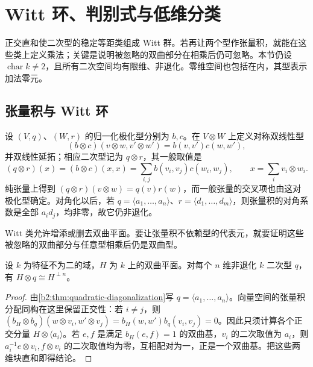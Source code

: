 
%
%

\section{Witt 环、判别式与低维分类}
\label{b2:sec:B02}

正交直和使二次型的稳定等距类组成 Witt 群。若再让两个型作张量积，就能在这些类上定义乘法；关键是说明被忽略的双曲部分在相乘后仍可忽略。本节仍设 \(\operatorname{char}k\ne2\)，且所有二次空间均有限维、非退化。零维空间也包括在内，其型表示加法零元。

\subsection{张量积与 Witt 环}
\label{b2:subsec:B02:01}

设 \((V,q)\)、\((W,r)\) 的归一化极化型分别为 \(b,c\)。在 \(V\otimes W\) 上定义对称双线性型
\[
	(b\otimes c)(v\otimes w,v'\otimes w')=b(v,v')c(w,w'),
\]
并双线性延拓；相应二次型记为 \(q\otimes r\)，其一般取值是
\[
	(q\otimes r)(x)=(b\otimes c)(x,x) =\sum_{i,j}b(v_i,v_j)c(w_i,w_j), \qquad x=\sum_i v_i\otimes w_i.
\]
纯张量上得到 \((q\otimes r)(v\otimes w)=q(v)r(w)\)，而一般张量的交叉项也由这对极化型确定。对角化以后，若 \(q=\langle a_1,\ldots,a_n\rangle\)、\(r=\langle d_1,\ldots,d_m\rangle\)，则张量积的对角系数是全部 \(a_id_j\)，均非零，故它仍非退化。

\ProseParagraphBreak
Witt 类允许增添或删去双曲平面。要让张量积不依赖型的代表元，就要证明这些被忽略的双曲部分与任意型相乘后仍是双曲型。

\begin{lemma}\label{b2:lem:B-hyperbolic-tensor}
	设 \(k\) 为特征不为二的域，\(H\) 为 \(k\) 上的双曲平面。对每个 \(n\) 维非退化 \(k\) 二次型 \(q\)，有 \(H\otimes q\cong H^{\perp n}\)。
\end{lemma}
\begin{proof}
	由\cref{b2:thm:quadratic-diagonalization}写 \(q=\langle a_1,\ldots,a_n\rangle\)。向量空间的张量积分配同构在这里保留正交性：若 \(i\ne j\)，则 \((b_H\otimes b_q)(w\otimes v_i,w'\otimes v_j)=b_H(w,w')b_q(v_i,v_j)=0\)。因此只须计算各个正交分量 \(H\otimes\langle a_i\rangle\)。若 \(e,f\) 是满足 \(b_H(e,f)=1\) 的双曲基，\(v_i\) 的二次取值为 \(a_i\)，则 \(a_i^{-1}e\otimes v_i,f\otimes v_i\) 的二次取值均为零，互相配对为一，正是一个双曲基。把这些两维块直和即得结论。
\end{proof}

